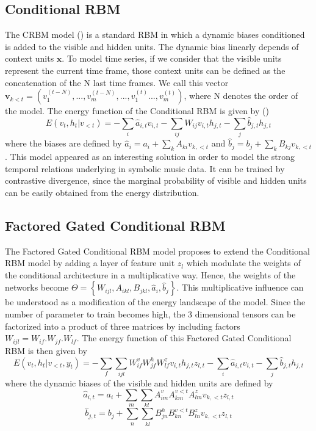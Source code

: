 \documentclass{article} %
\begin{document}
\subsection{Conditional RBM}
The \gls{CRBM} model (\cite{taylor2009composable}) is a standard \gls{RBM} in which a dynamic biases conditioned is added to the visible and hidden units. The dynamic bias linearly depends of context units $\bm{x}$.
To model time series, if we consider that the visible units represent the current time frame, those context units can be defined as the concatenation of the N last time frames. We call this vector $\bm{v}_{k<t} = \left( v_{1}^{(t-N)} , ... , v_{m}^{(t-N)}, ... , v_{1}^{(t)} ... , v_{m}^{(t)} \right)$, where N denotes the order of the model.
The energy function of the Conditional RBM is given by ()
\begin{equation}
\label{eq:energy_CRBM}
E(v_{t},h_{t}|v_{<t}) = - \sum_{i} \hat{a}_{i,t}v_{i,t} - \sum_{ij}W_{ij}v_{i,t}h_{j,t} - \sum_{j} \hat{b}_{j,t}h_{j,t} 
\end{equation}
where the biases are defined by $\hat{a}_{i} = a_{i} + \sum_{k}A_{ki}v_{k,<t}$ and $\hat{b}_{j} = b_{j} + \sum_{k}B_{kj}v_{k,<t}$.
This model appeared as an interesting solution in order to model the strong temporal relations underlying in symbolic music data. It can be trained by contrastive divergence, since the marginal probability of visible and hidden units can be easily obtained from the energy distribution.

\subsection{Factored Gated Conditional RBM}
The Factored Gated Conditional RBM model \cite{taylor2009factored} proposes to extend the Conditional RBM model by adding a layer of feature unit $z_{l}$ which modulate the weights of the conditional architecture in a multiplicative way. Hence, the weights of the networks become $\Theta = \left\lbrace W_{ijl} , A_{ikl} , B_{jkl} , \hat{a}_{i} , \hat{b}_{j} \right\rbrace$. This multiplicative influence can be understood as a modification of the energy landscape of the model. Since the number of parameter to train becomes high, the 3 dimensional tensors can be factorized into a product of three matrices by including factors $W_{ijl} = W_{if} . W_{jf} . W_{lf}$.
The energy function of this Factored Gated Conditional RBM is then given by
\begin{equation}
E(v_{t},h_{t}|v_{<t},y_{t}) = -\sum_{f}\sum_{ijl} W_{if}^{v} W_{jf}^{h} W_{lf}^{z} v_{i,t}h_{j,t}z_{l,t} 
- \sum_{i} \hat{a}_{i,t}v_{i,t} - \sum_{j} \hat{b}_{j,t}h_{j,t}
\end{equation}
where the dynamic biases of the visible and hidden units are defined by
\begin{equation}
\hat{a}_{i,t} = a_{i} + \sum_{m} \sum_{kl}A_{im}^{v}A_{km}^{v<t}A_{lm}^{z}v_{k,<t}z_{l,t}
\end{equation}
\begin{equation}
\hat{b}_{j,t} = b_{j} + \sum_{n} \sum_{kl}B_{jn}^{h}B_{kn}^{v<t}B_{ln}^{z}v_{k,<t}z_{l,t}
\end{equation}
\end{document}
